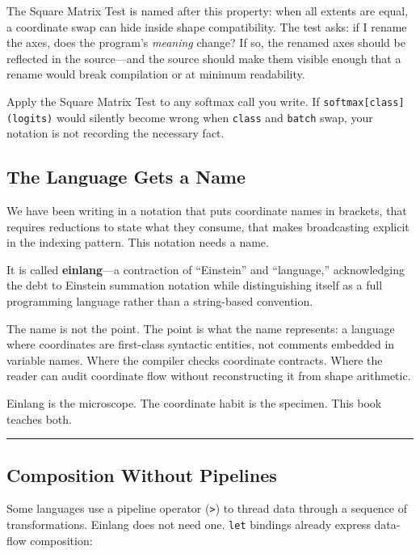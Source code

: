 \documentclass[11pt,]{article}
\begin{document}
The Square Matrix Test is named after this property: when all extents
are equal, a coordinate swap can hide inside shape compatibility. The
test asks: if I rename the axes, does the program's \emph{meaning}
change? If so, the renamed axes should be reflected in the source---and
the source should make them visible enough that a rename would break
compilation or at minimum readability.

Apply the Square Matrix Test to any softmax call you write. If
\texttt{softmax{[}class{]}(logits)} would silently become wrong when
\texttt{class} and \texttt{batch} swap, your notation is not recording
the necessary fact.

\hypertarget{the-language-gets-a-name}{%
\subsection{The Language Gets a Name}\label{the-language-gets-a-name}}

We have been writing in a notation that puts coordinate names in
brackets, that requires reductions to state what they consume, that
makes broadcasting explicit in the indexing pattern. This notation needs
a name.

It is called \textbf{einlang}---a contraction of ``Einstein'' and
``language,'' acknowledging the debt to Einstein summation notation
while distinguishing itself as a full programming language rather than a
string-based convention.

The name is not the point. The point is what the name represents: a
language where coordinates are first-class syntactic entities, not
comments embedded in variable names. Where the compiler checks
coordinate contracts. Where the reader can audit coordinate flow without
reconstructing it from shape arithmetic.

Einlang is the microscope. The coordinate habit is the specimen. This
book teaches both.

\begin{center}\rule{0.5\linewidth}{0.4pt}\end{center}

\hypertarget{composition-without-pipelines}{%
\subsection{Composition Without
Pipelines}\label{composition-without-pipelines}}

Some languages use a pipeline operator
(\texttt{\textbar{}\textgreater{}}) to thread data through a sequence of
transformations. Einlang does not need one. \texttt{let} bindings
already express data-flow composition:
\end{document}
